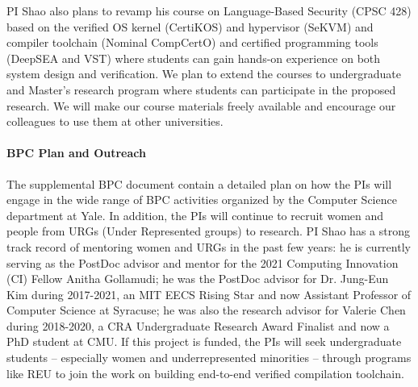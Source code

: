 PI Shao also plans to revamp his course on Language-Based Security
(CPSC 428) based on the verified OS kernel (CertiKOS) and hypervisor
(SeKVM) and compiler toolchain (Nominal CompCertO) and certified
programming tools (DeepSEA and VST) where students can gain hands-on
experience on both system design and verification. We plan to extend
the courses to undergraduate and Master's research program where
students can participate in the proposed research. We will make our
course materials freely available and encourage our colleagues to use
them at other universities.

\vspace*{-2ex}
\paragraph*{BPC Plan and Outreach}
The supplemental BPC document contain a detailed plan on how the PIs
will engage in the wide range of BPC activities organized by the
Computer Science department at Yale. In addition, the PIs will
continue to recruit women and people from URGs (Under Represented
groups) to research.  PI Shao has a strong track record of mentoring
women and URGs in the past few years: he is currently serving as the
PostDoc advisor and mentor for the 2021 Computing Innovation (CI)
Fellow Anitha Gollamudi; he was the PostDoc advisor for Dr. Jung-Eun
Kim during 2017-2021, an MIT EECS Rising Star and now Assistant
Professor of Computer Science at Syracuse; he was also the research
advisor for Valerie Chen during 2018-2020, a CRA Undergraduate
Research Award Finalist and now a PhD student at CMU.  If this project
is funded, the PIs will seek undergraduate students – especially women
and underrepresented minorities – through programs like REU to join
the work on building end-to-end verified compilation toolchain.


